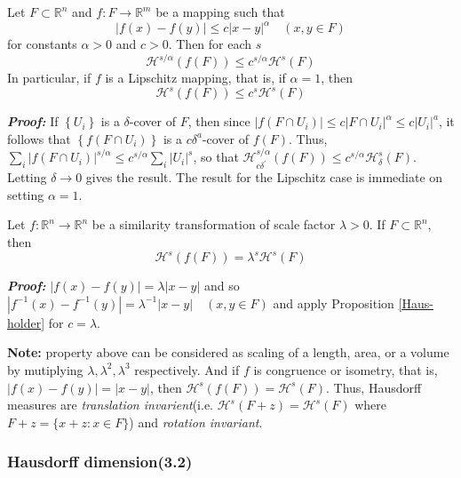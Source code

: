 \begin{proposition}\label{Haus-holder}
    Let $F \subset \mathbb{R}^{n}$ and $f: F \rightarrow \mathbb{R}^{m}$ be a mapping such that
$$
|f(x)-f(y)| \leq c|x-y|^{\alpha} \quad(x, y \in F)
$$
for constants $\alpha>0$ and $c>0 .$ Then for each $s$
$$
\mathcal{H}^{s / \alpha}(f(F)) \leq c^{s / \alpha} \mathcal{H}^{s}(F)
$$
In particular, if $f$ is a Lipschitz mapping, that is, if $\alpha=1$, then
$$
\mathcal{H}^{s}(f(F)) \leq c^{s} \mathcal{H}^{s}(F)
$$
\end{proposition}

\textbf{\textit{Proof:}} If $\left\{U_{i}\right\}$ is a $\delta$-cover of $F$, 
then since $\left|f\left(F \cap U_{i}\right)\right| \leq c\left|F \cap U_{i}\right|^{\alpha} \leq c\left|U_{i}\right|^{a}$, 
it follows that $\left\{f\left(F \cap U_{i}\right)\right\}$ is a $c \delta^{a}$-cover of $f(F)$. 
Thus, $\displaystyle\sum_{i}\left|f\left(F \cap U_{i}\right)\right|^{s / \alpha} \leq c^{s / \alpha} \sum_{i}\left|U_{i}\right|^{s}$, so that $\mathcal{H}_{c \delta^{\prime}}^{s / \alpha}(f(F)) \leq c^{s / \alpha} \mathcal{H}_{\delta}^{s}(F)$. Letting
$\delta \rightarrow 0$ gives the result. 
The result for the Lipschitz case is immediate on setting $\alpha=1$.

\begin{property}
    Let $f: \mathbb{R}^{n} \rightarrow \mathbb{R}^{n}$ be a similarity transformation of scale factor $\lambda>0$. If $F \subset \mathbb{R}^{n}$, then
$$
\mathcal{H}^{s}(f(F))=\lambda^{s} \mathcal{H}^{s}(F)
$$
\end{property}

\textbf{\textit{Proof:}} $|f(x)-f(y)|=\lambda|x-y|$ and so $\left|f^{-1}(x)-f^{-1}(y)\right|=\lambda^{-1}|x-y| \quad(x, y \in F)$ and apply Proposition \ref{Haus-holder} for $c=\lambda$.

\textbf{Note: } property above can be considered as scaling of a length, area, or a volume by mutiplying $\lambda, \lambda^2, \lambda^3$ respectively. And if $f$ is congruence or isometry, that is, $|f(x)-f(y)| = |x-y|$, then $\mathcal{H}^s(f(F)) = \mathcal{H}^s(F)$. 
Thus, Hausdorff measures are \textit{translation invarient}(i.e. $\mathcal{H}^s(F+z) = \mathcal{H}^s(F)$ where $F+z = \{x+z:x\in F\}$) and \textit{rotation invariant}. 

\newpage
\subsubsection{Hausdorff dimension(3.2)}

